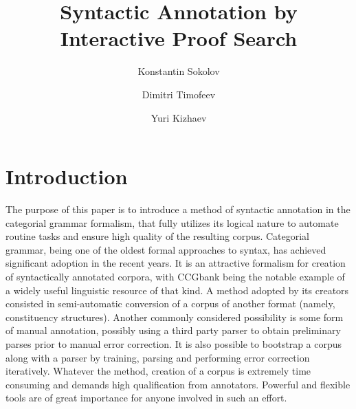 \documentclass[a4paper]{article}
\theoremstyle{example-style}
\begin{document}
\title{Syntactic Annotation by Interactive Proof Search}
\author[1]{Konstantin Sokolov}
\author[2]{Dimitri Timofeev}
\author[3]{Yuri Kizhaev}
\date{}

\maketitle

\section{Introduction}

The purpose of this paper is to introduce a method of syntactic annotation in the categorial grammar formalism, that fully utilizes its logical nature to automate routine tasks and ensure high quality of the resulting corpus. Categorial grammar, being one of the oldest formal approaches to syntax, has achieved significant adoption in the recent years. It is an attractive formalism for creation of syntactically annotated corpora, with CCGbank \parencite{hockenmaier2007ccgbank} being the notable example of a widely useful linguistic resource of that kind. A method adopted by its creators consisted in semi-automatic conversion of a corpus of another format (namely, constituency structures). Another commonly considered possibility is some form of manual annotation, possibly using a third party parser to obtain preliminary parses prior to manual error correction. It is also possible to bootstrap a corpus along with a parser by training, parsing and performing error correction iteratively. Whatever the method, creation of a corpus is extremely time consuming and demands high qualification from annotators. Powerful and flexible tools are of great importance for anyone involved in such an effort.
\end{document}
